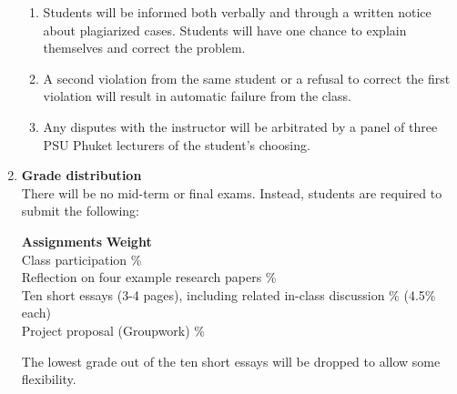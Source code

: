 \documentclass[a4paper,12pt]{article}
\begin{document}
\begin{enumerate}[label=\textbf{\Alph*}]
        \begin{enumerate}
            \item Students will be informed both verbally and through a written notice about plagiarized cases. Students will have one chance to explain themselves and correct the problem.
            \item A second violation from the same student or a refusal to correct the first violation will result in automatic failure from the class.
            \item Any disputes with the instructor will be arbitrated by a panel of three PSU Phuket lecturers of the student's choosing.
        \end{enumerate}
    \item \textbf{Grade distribution} \hfill \\
    There will be no mid-term or final exams. Instead, students are required to submit the following:
        \begin{tabbing}
            \textbf{Assignments} \hspace{10cm} \=\textbf{Weight} \\
            Class participation \% \\
            Reflection on four example research papers \% \\
            Ten short essays (3-4 pages), including related in-class discussion  \% (4.5\% each) \\
            Project proposal (Groupwork) \% \\
        \end{tabbing}

   The lowest grade out of the ten short essays will be dropped to allow some flexibility.


\end{enumerate}
\end{document}
